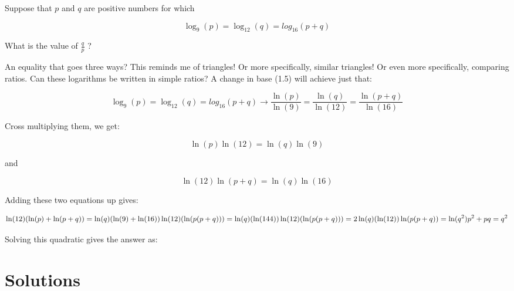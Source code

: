 \begin{question}

Suppose that $p$ and $q$ are positive numbers for which

$$
   \log_9(p) = \log_{12}(q) = log_{16}(p+q)
$$

What is the value of $\frac{q}{p}$ ?
\end{question}

\begin{solution}

An equality that goes three ways? This reminds me of triangles! Or more specifically, similar triangles! Or even more specifically, comparing ratios. Can these logarithms be written in simple ratios? A change in base (1.5) will achieve just that:

$$
   \log_9(p) = \log_{12}(q) = log_{16}(p+q) \rightarrow
   \frac{\ln(p)}{\ln(9)} = \frac{\ln(q)}{\ln(12)} = \frac{\ln(p+q)}{\ln(16)}
$$

\newpage

Cross multiplying them, we get:

$$
  \ln(p)\ln(12) = \ln(q)\ln(9)
$$

and

$$
  \ln(12)\ln(p+q) = \ln(q)\ln(16)
$$

Adding these two equations up gives:

$$
  \ln(12)(\ln(p)+\ln(p+q)) = \ln(q)(\ln(9)+\ln(16)) \\
  \ln(12)(\ln(p(p+q))) = \ln(q)(\ln(144)) \\
  \ln(12)(\ln(p(p+q))) = 2\ln(q)(\ln(12)) \\
  \ln(p(p+q)) = \ln(q^2) \\
  p^2 + pq = q^2
$$

Solving this quadratic gives the answer as: 

\end{solution}



\newpage
\section{Solutions}


\printsolutions